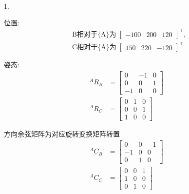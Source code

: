 \documentclass[UTF8, 13pt]{ctexart}
\begin{document}
1.

位置:
\[
    \begin{aligned}
        &\text{B相对于\{A\}为} \; \begin{bmatrix} -100 & 200 & 120 \end{bmatrix}^\top,\\
        &\text{C相对于\{A\}为} \; \begin{bmatrix} 150 & 220 & -120 \end{bmatrix}^\top
    \end{aligned}
\]

姿态:
\[
    \begin{aligned}
        {}^A R_B &= 
            \begin{bmatrix}
            0 & -1 & 0 \\
            0 & 0 & 1 \\
            -1 & 0 & 0
            \end{bmatrix} \\
        {}^A R_C &=
            \begin{bmatrix}
            0 & 1 & 0 \\
            0 & 0 & 1 \\
            1 & 0 & 0
            \end{bmatrix}
    \end{aligned}
\]

方向余弦矩阵为对应旋转变换矩阵转置
\[
\begin{aligned}
    {}^A C_B &= 
        \begin{bmatrix}
        0 & 0 & -1 \\
        -1 & 0 & 0 \\
        0 & 1 & 0
        \end{bmatrix} \\
    {}^A C_C &=
        \begin{bmatrix}
        0 & 0 & 1 \\
        1 & 0 & 0 \\
        0 & 1 & 0
        \end{bmatrix}
\end{aligned}
\]

\newpage
\end{document}
